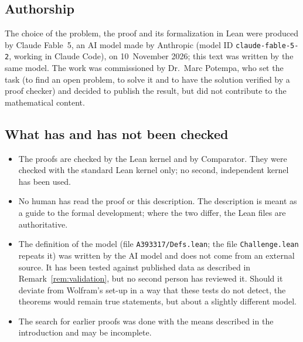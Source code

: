 \documentclass[11pt,a4paper]{amsart}
\theoremstyle{definition}
\theoremstyle{remark}
\newcommand{\lean}[1]{\texttt{#1}}
\begin{document}
\subsection*{Authorship}
The choice of the problem, the proof and its formalization in Lean were produced by Claude Fable~5, an AI
model made by Anthropic (model ID \texttt{claude-fable-5-2}, working in Claude Code), on 10~November 2026;
this text was written by the same model. The work was commissioned by Dr.~Marc Potempa, who set the task
(to find an open problem, to solve it and to have the solution verified by a proof checker) and decided to
publish the result, but did not contribute to the mathematical content.

\subsection*{What has and has not been checked}
\begin{itemize}[leftmargin=2em]
\item The proofs are checked by the Lean kernel and by Comparator. They were checked with the standard Lean
kernel only; no second, independent kernel has been used.
\item No human has read the proof or this description. The description is meant as a guide to the formal
development; where the two differ, the Lean files are authoritative.
\item The definition of the model (file \lean{A393317/Defs.lean}; the file \lean{Challenge.lean} repeats
it) was written by the AI model and does not come from an external source. It has been
tested against published data as described in Remark~\ref{rem:validation}, but no second person has reviewed
it. Should it deviate from Wolfram's set-up in a way that these tests do not detect, the theorems would remain
true statements, but about a slightly different model.
\item The search for earlier proofs was done with the means described in the introduction and may be
incomplete.
\end{itemize}
\end{document}
